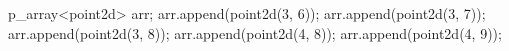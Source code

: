 p_array<point2d> arr;
arr.append(point2d(3, 6));
arr.append(point2d(3, 7));
arr.append(point2d(3, 8));
arr.append(point2d(4, 8));
arr.append(point2d(4, 9));
